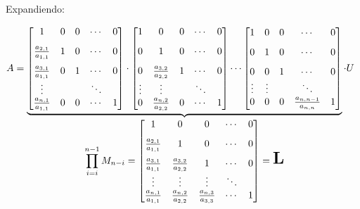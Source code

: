 \documentclass[]{article}
\begin{document}
Expandiendo:
\begin{center}
	$A=\underbrace{\begin{bmatrix}
		1								& 0								& 0								& \cdots							& 0								\\[8pt]
		\frac{a_{2,1}}{a_{1,1}}			& 1								& 0								& \cdots							& 0								\\[8pt]
		\frac{a_{3,1}}{a_{1,1}}			& 0								& 1								& \cdots							& 0								\\
		\vdots							&								&								& \ddots							&  								\\
		\frac{a_{n,1}}{a_{1,1}}			& 0								& 0								& \cdots							& 1
	\end{bmatrix}\cdot \begin{bmatrix}
		1								& 0								& 0								& \cdots							& 0								\\[8pt]
		0								& 1								& 0								& \cdots							& 0								\\[8pt]
		0								& \frac{a_{3,2}}{a_{2,2}}		& 1								& \cdots							& 0								\\
		\vdots							& \vdots						&								& \ddots							&  								\\
		0								& \frac{a_{n,2}}{a_{2,2}}		& 0								& \cdots							& 1
	\end{bmatrix} \cdots \begin{bmatrix}
		1								& 0								& 0								& \cdots							& 0								\\[8pt]
		0								& 1								& 0								& \cdots							& 0								\\[8pt]
		0								& 0								& 1								& \cdots							& 0								\\
		\vdots							& \vdots						&								& \ddots							&  								\\
		0								& 0								& 0								& \frac{a_{n,n-1}}{a_{n,n}}							& 1
	\end{bmatrix}}_{\displaystyle \prod_{i=i}^{n-1} M_{n-i} = \begin{bmatrix}
		1								& 0								& 0								& \cdots							& 0								\\[8pt]
		\frac{a_{2,1}}{a_{1,1}}			& 1								& 0								& \cdots							& 0								\\[8pt]
		\frac{a_{3,1}}{a_{1,1}}			& \frac{a_{3,2}}{a_{2,2}}		& 1								& \cdots							& 0								\\
		\vdots							& \vdots						& \vdots						& \ddots							&  								\\
		\frac{a_{n,1}}{a_{1,1}}			& \frac{a_{n,2}}{a_{2,2}}		& \frac{a_{n,3}}{a_{3,3}}		& \cdots							& 1
	\end{bmatrix}=\mbox{\LARGE{\textbf{L}}}}\cdot U$
\end{center}
\end{document}
